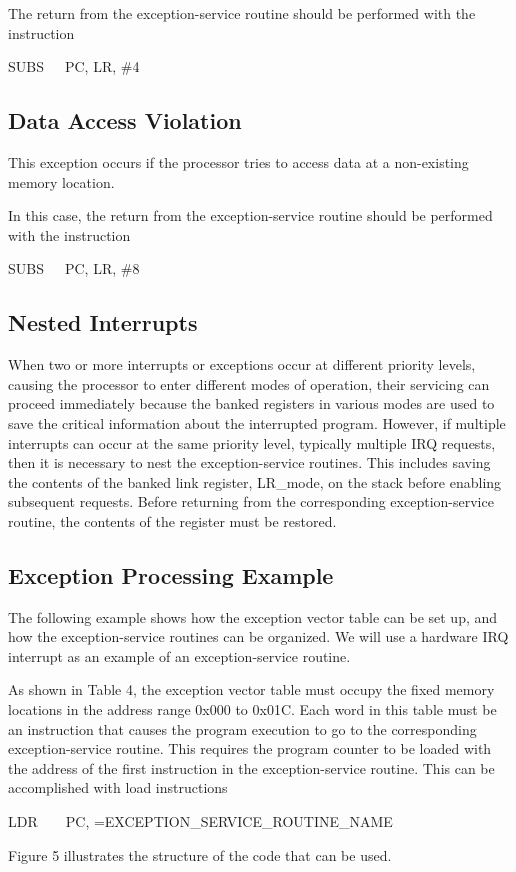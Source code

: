 \documentclass[11pt, twoside, pdftex]{article}
\begin{document}
The return from the exception-service routine should be performed
with the instruction
\begin{center}
SUBS~~~PC, LR, \#4
\end{center}
\noindent

\subsection{Data Access Violation}

This exception occurs if the processor tries to access data
at a non-existing memory location.

In this case, the return from the exception-service routine
should be performed with the instruction
\begin{center}
SUBS~~~PC, LR, \#8
\end{center}
\noindent

\subsection{Nested Interrupts}

When two or more interrupts or exceptions occur at different
priority levels, causing the processor to enter different
modes of operation, their servicing can proceed immediately
because the banked registers in various modes are used to save 
the critical information about the interrupted program.
However, if multiple interrupts can occur at the same priority
level, typically multiple IRQ requests, then it is necessary
to nest the exception-service routines. This includes saving
the contents of the banked link register, LR\_mode,
on the stack before enabling subsequent
requests. Before returning from the corresponding
exception-service routine, the contents of the register must
be restored.

\subsection{Exception Processing Example}

The following example shows how the exception vector table can be
set up, and how the exception-service routines can be organized.
We will use a hardware IRQ interrupt as an example of an
exception-service routine.

As shown in Table 4, the exception vector table must occupy
the fixed memory locations in the address range 0x000 to 0x01C.
Each word in this table must be an instruction that causes the
program execution to go to the corresponding exception-service
routine. This requires the program counter to be loaded with
the address of the first instruction in the exception-service
routine. This can be accomplished with load instructions
\begin{center}
LDR~~~~PC, =EXCEPTION\_SERVICE\_ROUTINE\_NAME
\end{center}
Figure 5 illustrates the structure of the code that can be used.
\end{document}
